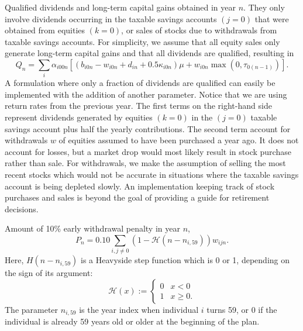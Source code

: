 \documentclass{report}[fleqn,11pt]
\begin{document}
\begin{description}[leftmargin=4em,style=multiline]
\item [$Q_n$]
	Qualified dividends and long-term capital gains obtained in year $n$.
	They only involve dividends occurring in the taxable savings accounts $(j=0)$ that
	were obtained from equities $(k=0)$, or sales of stocks due to withdrawals
	from taxable savings accounts.
	For simplicity, we assume that all equity sales only generate long-term capital gains and
	that all dividends are qualified, resulting in
	\begin{equation}
		\label{Eq:Qx2}
		Q_n = \sum_i \alpha_{i00n}\left[(b_{i0n} - w_{i0n} + d_{in} + 0.5\kappa_{i0n})\mu +
		w_{i0n}{\max(0, \tau_{0(n-1)})}\right].
	\end{equation}
	A formulation where only a fraction of dividends are qualified can easily be
	implemented with the addition of another parameter.
	Notice that we are using return rates from the previous year.
	The first terms on the right-hand side represent dividends generated by
        equities $(k=0)$ in the $(j=0)$ taxable savings account plus
	half the yearly contributions. The second term account for withdrawals $w$
        of equities assumed to have been purchased a year ago. 
	It does not account for losses, but a market drop
	would most likely result in stock purchase rather than sale.
	For withdrawals, we make the assumption of
	selling the most recent stocks which would not be accurate in situations where
	the taxable savings account is being depleted slowly. An implementation keeping track
	of stock purchases and sales is beyond the goal of providing a guide for retirement decisions.

\item [$P_n$]
	Amount of 10\% early withdrawal penalty in year $n$,
	\begin{equation}
		\label{Eq:PenTax0}
		P_n = 0.10 \sum_{i, j\neq0} (1 - \mathcal{H}(n - n_{i,59})) w_{ijn}.
	\end{equation}
        Here, $H(n - n_{i, 59})$ is a Heavyside step function which is 0 or 1, depending on the sign of
        its argument:
	\begin{equation}
	\mathcal{H}(x) :=
	\begin{cases}
         0 & x < 0 \\
         1 & x \geq 0.
	\end{cases}
	\end{equation}
        The parameter $n_{i, 59}$ is the year index when individual $i$ turns 59,
	or 0 if the individual is already 59 years old or older at the beginning of the plan.


\end{description}
\end{document}
